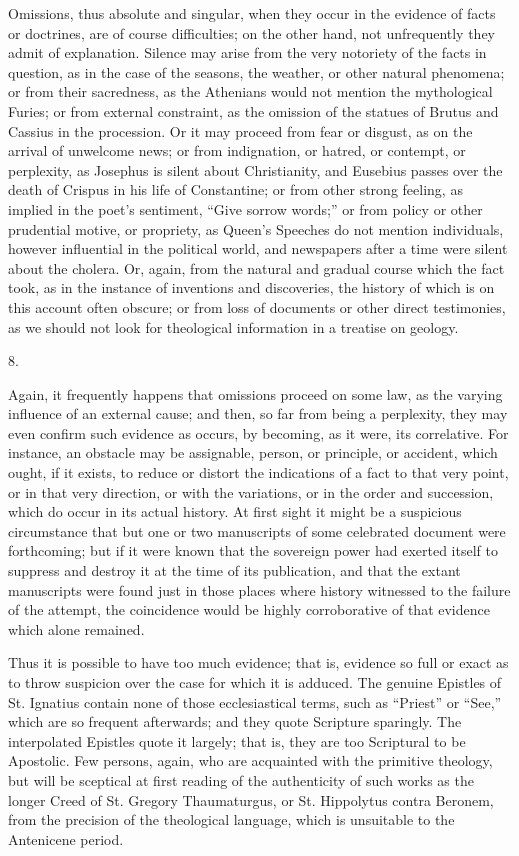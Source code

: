 Omissions, thus absolute and singular, when they occur
in the evidence of facts or doctrines, are of course
difficulties; on the other hand, not unfrequently they
admit of explanation. Silence may arise from the very
notoriety of the facts in question, as in the case of the
seasons, the weather, or other natural phenomena; or from
their sacredness, as the Athenians would not mention the
mythological Furies; or from external constraint, as the
omission of the statues of Brutus and Cassius in the
procession. Or it may proceed from fear or disgust, as on
the arrival of unwelcome news; or from indignation, or
hatred, or contempt, or perplexity, as Josephus is silent
about Christianity, and Eusebius passes over the death of
Crispus in his life of Constantine; or from other strong
feeling, as implied in the poet's sentiment, ``Give
sorrow words;'' or from policy or other prudential
motive, or propriety, as Queen's Speeches do not mention
individuals, however influential in the political world,
and newspapers after a time were silent about the
cholera. Or, again, from the natural and gradual course
which the fact took, as in the instance of inventions and
discoveries, the history of which is on this account
often obscure; or from loss of documents or other direct
testimonies, as we should not look for theological
information in a treatise on geology.

8.

Again, it frequently happens that omissions proceed on
some law, as the varying influence of an external cause;
and then, so far from being a perplexity, they may even
confirm such evidence as occurs, by becoming, as it were,
its correlative. For instance, an obstacle may be
assignable, person, or principle, or accident, which
ought, if it exists, to reduce or distort the indications
of a fact to that very point, or in that very direction,
or with the variations, or in the order and succession,
which do occur in its actual history. At first sight it
might be a suspicious circumstance that but one or two
manuscripts of some celebrated document were forthcoming;
but if it were known that the sovereign power had exerted
itself to suppress and destroy it at the time of its
publication, and that the extant manuscripts were found
just in those places where history witnessed to the
failure of the attempt, the coincidence would be highly
corroborative of that evidence which alone remained.

Thus it is possible to have too much evidence; that
is, evidence so full or exact as to throw suspicion over
the case for which it is adduced. The genuine Epistles of
St. Ignatius contain none of those ecclesiastical terms,
such as ``Priest'' or ``See,'' which are
so frequent afterwards; and they quote Scripture
sparingly. The interpolated Epistles quote it largely;
that is, they are too Scriptural to be Apostolic. Few
persons, again, who are acquainted with the primitive
theology, but will be sceptical at first reading of the
authenticity of such works as the longer Creed of St.
Gregory Thaumaturgus, or St. Hippolytus contra Beronem,
from the precision of the theological language, which is
unsuitable to the Antenicene period.

